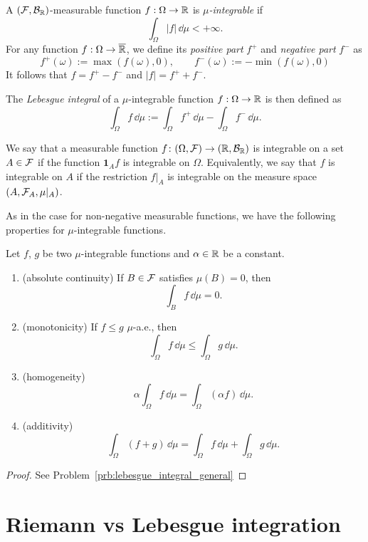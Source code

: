 \begin{definition}\label{def:lebesgue_integral_general}
	A $(\mathcal F,\mathcal B_{\mathbb R})$-measurable function $f: \Omega \to \mathbb R$ is \emph{$\mu$-integrable} if 
	\[
	\int_\Omega |f|\, \dd \mu < +\infty.	
	\]
	For any function $f: \Omega \to \overline{\mathbb R}$, we define its \emph{positive part} $f^+$ and \emph{negative part} $f^-$ as
\[
	f^+(\omega) := \max( f(\omega), 0 ),\qquad 
	f^-(\omega) := - \min( f(\omega), 0 ) 
\]
It follows that $f = f^+ - f^-$ and $|f| = f^+ + f^-$.

	The \emph{Lebesgue integral} of a $\mu$-integrable function $f: \Omega \to \mathbb R$ is then defined as
	\[
		\int_\Omega f\,\dd \mu := \int_\Omega f^+\, \dd \mu - \int_\Omega f^-\, \dd \mu.
	\]
\end{definition}

We say that a measurable function $f\colon(\Omega, \mathcal F) \to (\mathbb R, \mathcal B_{\mathbb R})$ is integrable on a set $A \in \mathcal F$ if the function $\mathbf{1}_A f$ is integrable on $\Omega$. Equivalently, we say that $f$ is integrable on $A$ if the restriction $f|_A$ is integrable on the measure space $(A, \mathcal F_A, \mu|_A)$. 


As in the case for non-negative measurable functions, we have the following properties for $\mu$-integrable functions.

\begin{proposition}\label{prop:properties-integral}
	Let $f$, $g$ be two $\mu$-integrable functions and $\alpha \in \mathbb R$ be a constant.
	\begin{enumerate}
		\item (absolute continuity) If $B \in \mathcal F$ satisfies $\mu(B) = 0$, then
		\[
		\int_{B} f\, \dd \mu = 0. 
		\]
		\item (monotonicity) If $f \leq g$ $\mu$-a.e., then
		\[
		\int_\Omega f \,\dd \mu \leq \int_\Omega g \,\dd \mu.
		\]
		\item (homogeneity) 
		\[
		\alpha \int_\Omega f \,\dd \mu = \int_\Omega (\alpha f )\,\dd \mu.
		\]
		\item (additivity)
		\[
		\int_\Omega (f + g)\, \dd \mu = \int_\Omega f 
		\,\dd \mu + \int_\Omega g \,\dd \mu.
		\]	
	\end{enumerate}
\end{proposition}

\begin{proof}
See Problem~\ref{prb:lebesgue_integral_general}
\end{proof}

\section{Riemann vs Lebesgue integration}

